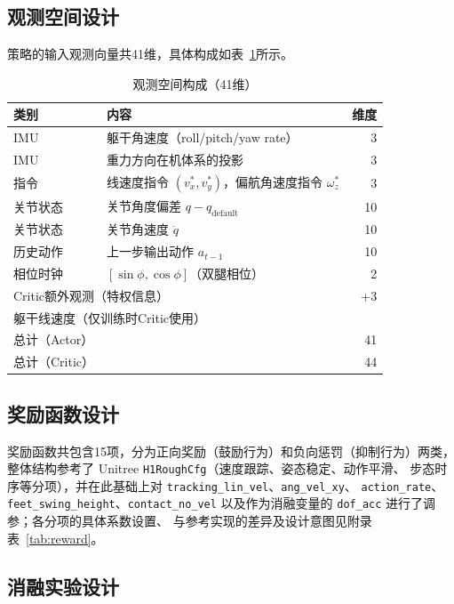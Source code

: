 \documentclass[12pt, a4paper]{article}
\begin{document}
\subsection{观测空间设计}

策略的输入观测向量共41维，具体构成如表~\ref{tab:obs}所示。

\begin{table}[H]
\centering
\caption{观测空间构成（41维）}
\label{tab:obs}
\begin{tabular}{llr}
\toprule
类别 & 内容 & 维度 \\
\midrule
IMU & 躯干角速度（roll/pitch/yaw rate） & 3 \\
IMU & 重力方向在机体系的投影 & 3 \\
指令 & 线速度指令 $(v_x^*, v_y^*)$，偏航角速度指令 $\omega_z^*$ & 3 \\
关节状态 & 关节角度偏差 $q - q_\text{default}$ & 10 \\
关节状态 & 关节角速度 $\dot{q}$ & 10 \\
历史动作 & 上一步输出动作 $a_{t-1}$ & 10 \\
相位时钟 & $[\sin\phi, \cos\phi]$（双腿相位） & 2 \\
\midrule
\multicolumn{2}{l}{Critic额外观测（特权信息）} & +3 \\
\multicolumn{2}{l}{躯干线速度（仅训练时Critic使用）} & \\
\midrule
总计（Actor） & & 41 \\
总计（Critic） & & 44 \\
\bottomrule
\end{tabular}
\end{table}

\subsection{奖励函数设计}

奖励函数共包含15项，分为正向奖励（鼓励行为）和负向惩罚（抑制行为）两类，
整体结构参考了 Unitree \texttt{H1RoughCfg}（速度跟踪、姿态稳定、动作平滑、
步态时序等分项），并在此基础上对 \texttt{tracking\_lin\_vel}、\texttt{ang\_vel\_xy}、
\texttt{action\_rate}、\texttt{feet\_swing\_height}、\texttt{contact\_no\_vel}
以及作为消融变量的 \texttt{dof\_acc} 进行了调参；各分项的具体系数设置、
与参考实现的差异及设计意图见附录表~\ref{tab:reward}。

\subsection{消融实验设计}
\end{document}
